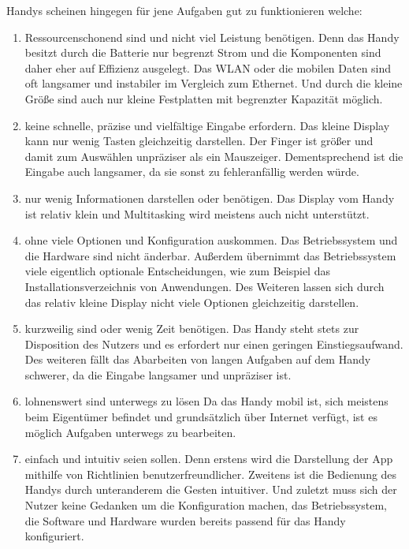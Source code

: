 %
\myNewSection
Handys scheinen hingegen für jene Aufgaben gut zu funktionieren welche:
\begin{enumerate}
	\item Ressourcenschonend sind und nicht viel Leistung benötigen.\newline%
	Denn das Handy besitzt durch die Batterie nur begrenzt Strom und die Komponenten sind daher eher auf Effizienz ausgelegt. Das WLAN oder die mobilen Daten sind oft langsamer und instabiler im Vergleich zum Ethernet. Und durch die kleine Größe sind auch nur kleine Festplatten mit begrenzter Kapazität möglich.%
	\item keine schnelle, präzise und vielfältige Eingabe erfordern.\newline%
	Das kleine Display kann nur wenig Tasten gleichzeitig darstellen. Der Finger ist größer und damit zum Auswählen unpräziser als ein Mauszeiger. Dementsprechend ist die Eingabe auch langsamer, da sie sonst zu fehleranfällig werden würde.%
	\item nur wenig Informationen darstellen oder benötigen.\newline%
	Das Display vom Handy ist relativ klein und Multitasking wird meistens auch nicht unterstützt.%
	\item ohne viele Optionen und Konfiguration auskommen.\newline%
	Das Betriebssystem und die Hardware sind nicht änderbar. Außerdem übernimmt das Betriebssystem viele eigentlich optionale Entscheidungen, wie zum Beispiel das Installationsverzeichnis von Anwendungen. Des Weiteren lassen sich durch das relativ kleine Display nicht viele Optionen gleichzeitig darstellen.%
	\item kurzweilig sind oder wenig Zeit benötigen.\newline%
	Das Handy steht stets zur Disposition des Nutzers und es erfordert nur einen geringen Einstiegsaufwand. Des weiteren fällt das Abarbeiten von langen Aufgaben auf dem Handy schwerer, da die Eingabe langsamer und unpräziser ist.%
	\item lohnenswert sind unterwegs zu lösen\newline%
	Da das Handy mobil ist, sich meistens beim Eigentümer befindet und grundsätzlich über Internet verfügt, ist es möglich Aufgaben unterwegs zu bearbeiten.%
	\item einfach und intuitiv seien sollen.\myTodo\newline%
	Denn erstens wird die Darstellung der App mithilfe von Richtlinien benutzerfreundlicher. Zweitens ist die Bedienung des Handys durch unteranderem die Gesten intuitiver. Und zuletzt muss sich der Nutzer keine Gedanken um die Konfiguration machen, das Betriebssystem, die Software und Hardware wurden bereits passend für das Handy konfiguriert.%
\end{enumerate}


